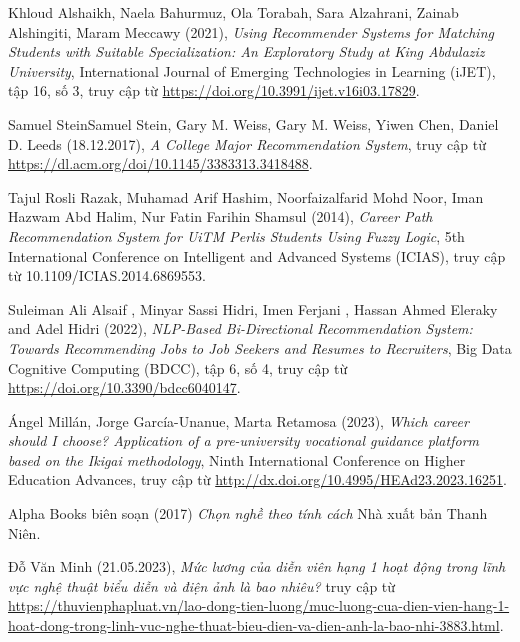 \begin{thebibliography}{99}
    Khloud Alshaikh, Naela Bahurmuz, Ola Torabah, Sara Alzahrani, Zainab Alshingiti, Maram Meccawy (2021),
    \emph{Using Recommender Systems for Matching Students with Suitable Specialization: An Exploratory Study at King Abdulaziz University},
    International Journal of Emerging Technologies in Learning (iJET),
    tập 16, số 3,
    truy cập từ \href{https://doi.org/10.3991/ijet.v16i03.17829}{\color{black}https://doi.org/10.3991/ijet.v16i03.17829}.

    Samuel SteinSamuel Stein, Gary M. Weiss, Gary M. Weiss, Yiwen Chen, Daniel D. Leeds (18.12.2017),
    \emph{A College Major Recommendation System},
    truy cập từ \href{https://dl.acm.org/doi/10.1145/3383313.3418488}{\color{black}https://dl.acm.org/doi/10.1145/3383313.3418488}.

    Tajul Rosli Razak, Muhamad Arif Hashim, Noorfaizalfarid Mohd Noor, Iman Hazwam Abd Halim, Nur Fatin Farihin Shamsul (2014),
    \emph{Career Path Recommendation System for UiTM Perlis Students Using Fuzzy Logic},
    5th International Conference on Intelligent and Advanced Systems (ICIAS),
    truy cập từ 10.1109/ICIAS.2014.6869553.

    Suleiman Ali Alsaif , Minyar Sassi Hidri, Imen Ferjani , Hassan Ahmed Eleraky and Adel Hidri (2022),
    \emph{NLP-Based Bi-Directional Recommendation System: Towards Recommending Jobs to Job Seekers and Resumes to Recruiters},
    Big Data Cognitive Computing (BDCC),
    tập 6, số 4,
    truy cập từ \href{https://doi.org/10.3390/bdcc6040147}{\color{black}https://doi.org/10.3390/bdcc6040147}.

    Ángel Millán, Jorge García-Unanue, Marta Retamosa (2023),
    \emph{Which career should I choose? Application of a pre-university vocational guidance platform based on the Ikigai methodology},
     Ninth International Conference on Higher Education Advances,
    truy cập từ \href{http://dx.doi.org/10.4995/HEAd23.2023.16251}{\color{black}http://dx.doi.org/10.4995/HEAd23.2023.16251}.

    Alpha Books biên soạn (2017)
    \emph{Chọn nghề theo tính cách}
    Nhà xuất bản Thanh Niên.

    Đỗ Văn Minh (21.05.2023),
    \emph{Mức lương của diễn viên hạng 1 hoạt động trong lĩnh vực nghệ thuật biểu diễn và điện ảnh là bao nhiêu?}
    truy cập từ \href{https://thuvienphapluat.vn/lao-dong-tien-luong/muc-luong-cua-dien-vien-hang-1-hoat-dong-trong-linh-vuc-nghe-thuat-bieu-dien-va-dien-anh-la-bao-nhi-3883.html}{\color{black}https://thuvienphapluat.vn/lao-dong-tien-luong/muc-luong-cua-dien-vien-hang-1-hoat-dong-trong-linh-vuc-nghe-thuat-bieu-dien-va-dien-anh-la-bao-nhi-3883.html}.


\end{thebibliography}
